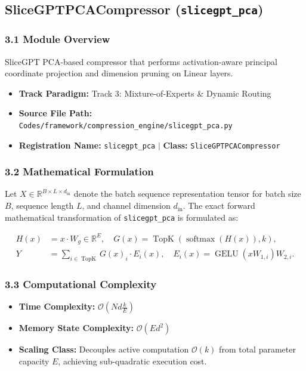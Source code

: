 \subsection{SliceGPTPCACompressor (\texttt{slicegpt\_pca})}
\label{sec:app_module_slicegpt_pca}

\subsubsection*{3.1 Module Overview}
SliceGPT PCA-based compressor that performs activation-aware principal coordinate projection and dimension pruning on Linear layers.
\begin{itemize}
    \item \textbf{Track Paradigm:} Track 3: Mixture-of-Experts & Dynamic Routing
    \item \textbf{Source File Path:} \texttt{Codes/framework/compression\_engine/slicegpt\_pca.py}
    \item \textbf{Registration Name:} \texttt{slicegpt\_pca} $\mid$ \textbf{Class:} \texttt{SliceGPTPCACompressor}
\end{itemize}

\subsubsection*{3.2 Mathematical Formulation}
Let $X \in \mathbb{R}^{B \times L \times d_{\text{in}}}$ denote the batch sequence representation tensor for batch size $B$, sequence length $L$, and channel dimension $d_{\text{in}}$. The exact forward mathematical transformation of \texttt{slicegpt\_pca} is formulated as:

\begin{align}
H(x) &= x \cdot W_g \in \mathbb{R}^{E}, \quad G(x) = \operatorname{TopK}\left(\operatorname{softmax}(H(x)), k\right), \\
Y &= \sum_{i \in \operatorname{TopK}} G(x)_i \cdot E_i(x), \quad E_i(x) = \operatorname{GELU}(x W_{1, i}) W_{2, i}.
\end{align}


\subsubsection*{3.3 Computational Complexity}
\begin{itemize}
    \item \textbf{Time Complexity:} $\mathcal{O}(N d \frac{k}{E})$
    \item \textbf{Memory State Complexity:} $\mathcal{O}(E d^2)$
    \item \textbf{Scaling Class:} Decouples active computation $\mathcal{O}(k)$ from total parameter capacity $E$, achieving sub-quadratic execution cost.
\end{itemize}

